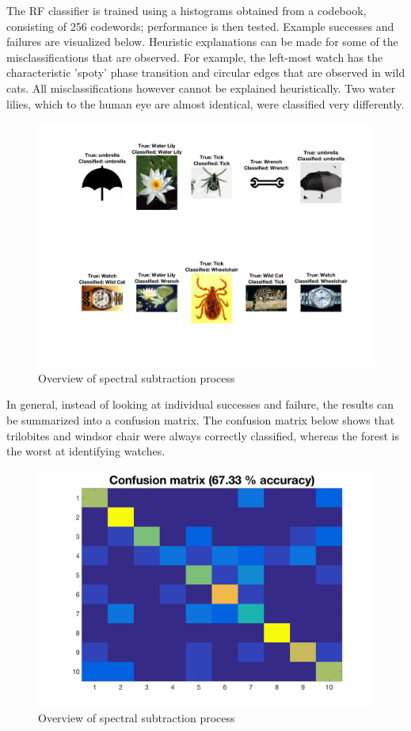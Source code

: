 \documentclass[a4paper,pra,twocolumn,10pt,aps,longbibliography,nobalancelastpage]{revtex4-1}
\begin{document}
The RF classifier is trained using a histograms obtained from a codebook, consisting of 256 codewords; performance is then tested. Example successes and failures are visualized below.  Heuristic explanations can be made for some of the misclassifications that are observed. For example, the left-most watch has the characteristic 'spoty' phase transition and circular edges that are observed in wild cats. All misclassifications however cannot be explained heuristically. Two water lilies, which to the human eye are almost identical, were classified very differently. 

\begin{figure}[H]
	\centering
    \includegraphics[width=\columnwidth]{images}
    \caption{Overview of spectral subtraction process}
\end{figure}

In general, instead of looking at individual successes and failure, the results can be summarized into a confusion matrix. The confusion matrix below shows that trilobites and windsor chair were always correctly classified, whereas the forest is the worst at identifying watches. 

\begin{figure}[H]
	\centering
    \includegraphics[width=0.70\columnwidth]{confus}    
    \caption{Overview of spectral subtraction process}
\end{figure}
\end{document}
